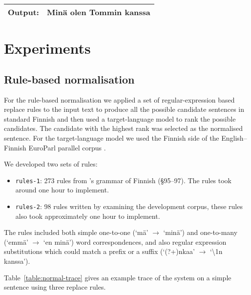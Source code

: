 \documentclass[11pt]{article}
\begin{document}
\begin{table*}
\begin{tabular}{|l|l|r|l|}
    \hline
    \textbf{Output:} & \multicolumn{3}{l|}{Min\"{a} olen Tommin kanssa} \\
    \hline
  \end{tabular}
  \caption{Example trace of the normalisation method. Rules are applied in order to each of 
     the possible candidate translations in turn. The candidates are then ranked using an $n$-gram language model 
     of standard Finnish and either an $n$-best list
     or the best candidate is output.}
  \label{table:normal-trace}
\end{table*}
  \newpage

\section{Experiments}

\subsection{Rule-based normalisation}



For the rule-based normalisation we applied a set of regular-expression based 
replace rules to the input text to produce all the possible candidate sentences 
in standard Finnish and then used a target-language model to rank the possible 
candidates. The candidate with the highest rank was selected as the normalised sentence.
For the target-language model we used the Finnish side of the English--Finnish EuroParl
parallel corpus \cite{koehn2005}.

We developed two sets of rules:

\begin{itemize}
  \item \texttt{rules-1}: 273 rules from 's grammar of Finnish (\S95--97). The 
    rules took around one hour to implement.
  \item \texttt{rules-2}: 98 rules written by examining the development corpus, these rules also
    took approximately one hour to implement.
\end{itemize}

The rules included both simple one-to-one (`m\"{a}' $\rightarrow$ `min\"{a}') and one-to-many (`emm\"{a}' $\rightarrow$ `en min\"{a}') word correspondences,
and also regular expression substitutions which could match a prefix or a suffix (`(?+)nkaa' $\rightarrow$ `\textbackslash1n kanssa').

Table~\ref{table:normal-trace} gives an example trace of the system on a simple sentence
using three replace rules.
\end{document}
